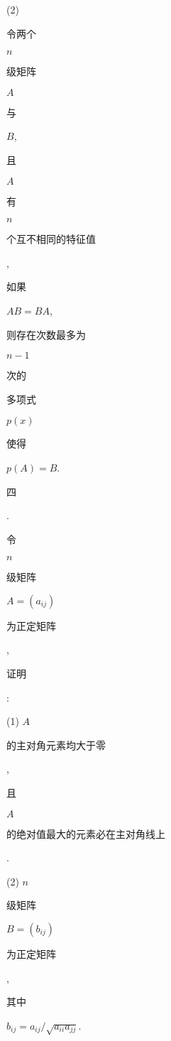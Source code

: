 \documentclass[10pt]{article}
\begin{document}
(2) \begin{CJK}{UTF8}{mj}令两个\end{CJK} $n$ \begin{CJK}{UTF8}{mj}级矩阵\end{CJK} $A$ \begin{CJK}{UTF8}{mj}与\end{CJK} $B$, \begin{CJK}{UTF8}{mj}且\end{CJK} $A$ \begin{CJK}{UTF8}{mj}有\end{CJK} $n$ \begin{CJK}{UTF8}{mj}个互不相同的特征值\end{CJK}, \begin{CJK}{UTF8}{mj}如果\end{CJK} $A B=B A$, \begin{CJK}{UTF8}{mj}则存在次数最多为\end{CJK} $n-1$ \begin{CJK}{UTF8}{mj}次的\end{CJK} \begin{CJK}{UTF8}{mj}多项式\end{CJK} $p(x)$ \begin{CJK}{UTF8}{mj}使得\end{CJK} $p(A)=B$.

\begin{CJK}{UTF8}{mj}四\end{CJK}. \begin{CJK}{UTF8}{mj}令\end{CJK} $n$ \begin{CJK}{UTF8}{mj}级矩阵\end{CJK} $A=\left(a_{i j}\right)$ \begin{CJK}{UTF8}{mj}为正定矩阵\end{CJK}, \begin{CJK}{UTF8}{mj}证明\end{CJK}:

(1) $A$ \begin{CJK}{UTF8}{mj}的主对角元素均大于零\end{CJK}, \begin{CJK}{UTF8}{mj}且\end{CJK} $A$ \begin{CJK}{UTF8}{mj}的绝对值最大的元素必在主对角线上\end{CJK}.

(2) $n$ \begin{CJK}{UTF8}{mj}级矩阵\end{CJK} $B=\left(b_{i j}\right)$ \begin{CJK}{UTF8}{mj}为正定矩阵\end{CJK}, \begin{CJK}{UTF8}{mj}其中\end{CJK} $b_{i j}=a_{i j} / \sqrt{a_{i i} a_{j j}}$.
\end{document}
